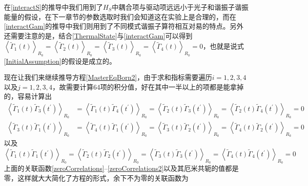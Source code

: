 在\eqref{interactS}的推导中我们用到了$H_S$中耦合项与驱动项远远小于光子和谐振子谐振能量的假设，在下一章节的参数选取时我们会知道这在实验上是合理的，而在\eqref{interactGam}的推导中我们则用到了不同模式谐振子算符相互对易的特点。另外还需要注意的是，结合\eqref{ThermalState}与\eqref{interactGam}可以得到$\left\langle\tilde{\Gamma}_{1}(t)\right\rangle_{R_0}=\left\langle\tilde{\Gamma}_{2}(t)\right\rangle_{R_0}=\left\langle\tilde{\Gamma}_{3}(t)\right\rangle_{R_0}=\left\langle\tilde{\Gamma}_{4}(t)\right\rangle_{R_0}=0$，也就是说式\eqref{InitialAssumption}的假设是成立的。

现在让我们来继续推导方程\eqref{MasterEqBorn2}，由于求和指标需要遍历$i=1,2,3,4$以及$j=1,2,3,4$，故需要计算64项的积分值，好在其中一半以上的项都是能拿掉的，容易计算出
\begin{align}
	\left\langle\tilde{\Gamma}_{1}(t) \tilde{\Gamma}_{3}\left(t^{\prime}\right)\right\rangle_{R_0} &=\left\langle\tilde{\Gamma}_{1}(t) \tilde{\Gamma}_{4}\left(t^{\prime}\right)\right\rangle_{R_0}=\left\langle\tilde{\Gamma}_{2}(t) \tilde{\Gamma}_{3}\left(t^{\prime}\right)\right\rangle_{R_0}=\left\langle\tilde{\Gamma}_{2}(t) \tilde{\Gamma}_{4}\left(t^{\prime}\right)\right\rangle_{R_0}=0 
	\label{zeroCorrelations} \\
	\left\langle\tilde{\Gamma}_{3}(t) \tilde{\Gamma}_{1}\left(t^{\prime}\right)\right\rangle_{R_0} &=\left\langle\tilde{\Gamma}_{4}(t) \tilde{\Gamma}_{1}\left(t^{\prime}\right)\right\rangle_{R_0}=\left\langle\tilde{\Gamma}_{3}(t) \tilde{\Gamma}_{2}\left(t^{\prime}\right)\right\rangle_{R_0}=\left\langle\tilde{\Gamma}_{4}(t) \tilde{\Gamma}_{2}\left(t^{\prime}\right)\right\rangle_{R_0}=0
\end{align}
以及
\begin{equation}
\left\langle\tilde{\Gamma}_{1}(t) \tilde{\Gamma}_{1}\left(t^{\prime}\right)\right\rangle_{R_0} =\left\langle\tilde{\Gamma}_{2}(t) \tilde{\Gamma}_{2}\left(t^{\prime}\right)\right\rangle_{R_0}=\left\langle\tilde{\Gamma}_{3}(t) \tilde{\Gamma}_{3}\left(t^{\prime}\right)\right\rangle_{R_0}=\left\langle\tilde{\Gamma}_{4}(t) \tilde{\Gamma}_{4}\left(t^{\prime}\right)\right\rangle_{R_0}=0
\label{zeroCorrelations2}
\end{equation}
上面的关联函数\eqref{zeroCorrelations}--\eqref{zeroCorrelations2}以及其厄米共轭的值都是零，这样就大大简化了方程的形式，余下不为零的关联函数为
